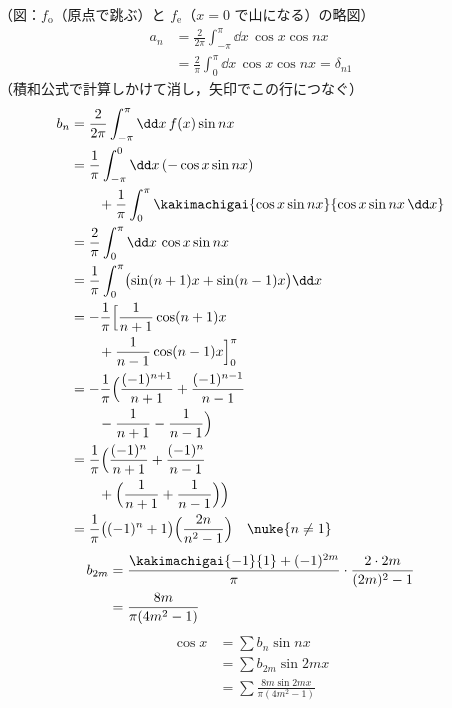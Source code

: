 （図：$f_{\mathrm{o}}$（原点で跳ぶ）と $f_{\mathrm{e}}$（$x=0$ で山になる）の略図）
\begin{align*}
  a_n&=\frac{2}{2\pi}\int_{-\pi}^{\pi}\dd x\,\cos x\cos nx\\
  &=\frac{2}{\pi}\int_{0}^{\pi}\dd x\,\cos x\cos nx=\delta_{n1}
\end{align*}
（積和公式で計算しかけて消し，矢印でこの行につなぐ）
\begin{align*}
  b_n&=\frac{2}{2\pi}\int_{-\pi}^{\pi}\dd x\,f(x)\sin nx\\
  &=\frac{1}{\pi}\int_{-\pi}^{0}\dd x\,(-\cos x\sin nx)\\
  &\qquad+\frac{1}{\pi}\int_{0}^{\pi}\kakimachigai{\cos x\sin nx}{\cos x\sin nx\,\dd x}\\
  &=\frac{2}{\pi}\int_{0}^{\pi}\dd x\,\cos x\sin nx\\
  &=\frac{1}{\pi}\int_{0}^{\pi}\bigl(\sin(n+1)x+\sin(n-1)x\bigr)\dd x\\
  &=-\frac{1}{\pi}\Bigl[\frac{1}{n+1}\cos(n+1)x\\
  &\qquad+\frac{1}{n-1}\cos(n-1)x\Bigr]_{0}^{\pi}\\
  &=-\frac{1}{\pi}\Bigl(\frac{(-1)^{n+1}}{n+1}+\frac{(-1)^{n-1}}{n-1}\\
  &\qquad-\frac{1}{n+1}-\frac{1}{n-1}\Bigr)\\
  &=\frac{1}{\pi}\Bigl(\frac{(-1)^{n}}{n+1}+\frac{(-1)^{n}}{n-1}\\
  &\qquad+\Bigl(\frac{1}{n+1}+\frac{1}{n-1}\Bigr)\Bigr)\\
  &=\frac{1}{\pi}\bigl((-1)^{n}+1\bigr)\Bigl(\frac{2n}{n^{2}-1}\Bigr)\quad\nuke{n\neq1}
\end{align*}
\begin{align*}
  b_{2m}&=\frac{\kakimachigai{-1}{1}+(-1)^{2m}}{\pi}\cdot\frac{2\cdot2m}{(2m)^{2}-1}\\
  &=\frac{8m}{\pi(4m^{2}-1)}
\end{align*}
\begin{align*}
  \cos x&=\sum b_n\sin nx\\
  &=\sum b_{2m}\sin2mx\\
  &=\sum\frac{8m\sin2mx}{\pi(4m^{2}-1)}
\end{align*}
